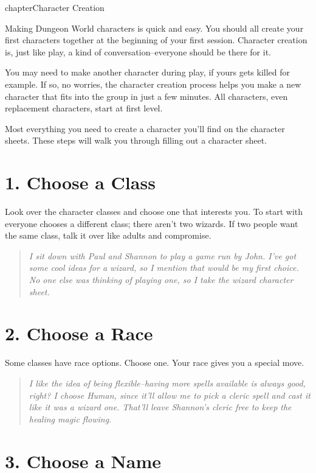 chapter{Character Creation}

Making Dungeon World characters is quick and easy. You should all create your first characters together at the beginning of your first session. Character creation is, just like play, a kind of conversation--everyone should be there for it.

You may need to make another character during play, if yours gets killed for example. If so, no worries, the character creation process helps you make a new character that fits into the group in just a few minutes. All characters, even replacement characters, start at first level.

Most everything you need to create a character you'll find on the character sheets. These steps will walk you through filling out a character sheet.
\section*{1. Choose a Class}

Look over the character classes and choose one that interests you. To start with everyone chooses a different class; there aren't two wizards. If two people want the same class, talk it over like adults and compromise.

\begin{quote}
\emph{I sit down with Paul and Shannon to play a game run by John. I've got some cool ideas for a wizard, so I mention that would be my first choice. No one else was thinking of playing one, so I take the wizard character sheet.}
\end{quote}
\section*{2. Choose a Race}

Some classes have race options. Choose one. Your race gives you a special move.

\begin{quote}
\emph{I like the idea of being flexible--having more spells available is always good, right? I choose Human, since it'll allow me to pick a cleric spell and cast it like it was a wizard one. That'll leave Shannon's cleric free to keep the healing magic flowing.}
\end{quote}
\section*{3. Choose a Name}

